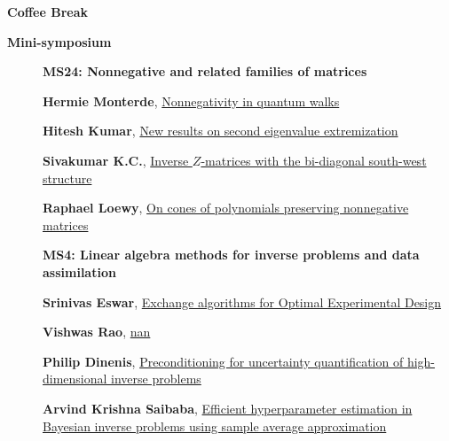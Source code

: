 \documentclass[ILAS2025-program.tex]{subfiles}
\begin{document}
\begin{description}
\begin{description}
        \end{description}
    \item[\info{15:30\textrm{--}16:00}] \textbf{Coffee Break} 
    \item[\info{16:00\textrm{--}18:00}] \textbf{Mini-symposium} 
    \begin{description}
    \item[] {\color{mstitle}\textbf{MS24: Nonnegative and related families of matrices}} 
    \item[] \hypertarget{up0351}{}\textbf{Hermie Monterde}, \hyperlink{down0351}{Nonnegativity in quantum walks
}
        \item[] \hypertarget{up0352}{}\textbf{Hitesh Kumar}, \hyperlink{down0352}{New results on second eigenvalue extremization}
        \item[] \hypertarget{up0353}{}\textbf{Sivakumar K.C.}, \hyperlink{down0353}{Inverse $Z$-matrices with the bi-diagonal south-west structure
}
        \item[] \hypertarget{up0354}{}\textbf{Raphael Loewy}, \hyperlink{down0354}{On cones of polynomials preserving nonnegative matrices}
        \end{description}
    \begin{description}
    \item[] {\color{mstitle}\textbf{MS4: Linear algebra methods for inverse problems and data assimilation}} 
    \item[] \hypertarget{up0355}{}\textbf{Srinivas Eswar}, \hyperlink{down0355}{Exchange algorithms for Optimal Experimental Design
}
        \item[] \hypertarget{up0356}{}\textbf{Vishwas Rao}, \hyperlink{down0356}{nan}
        \item[] \hypertarget{up0357}{}\textbf{Philip Dinenis}, \hyperlink{down0357}{Preconditioning for uncertainty quantification of high-dimensional inverse problems}
        \item[] \hypertarget{up0358}{}\textbf{Arvind Krishna Saibaba}, \hyperlink{down0358}{Efficient hyperparameter estimation in Bayesian inverse problems using sample average approximation
}
        \end{description}
    \begin{description}

\end{description}
\end{description}
\end{document}
